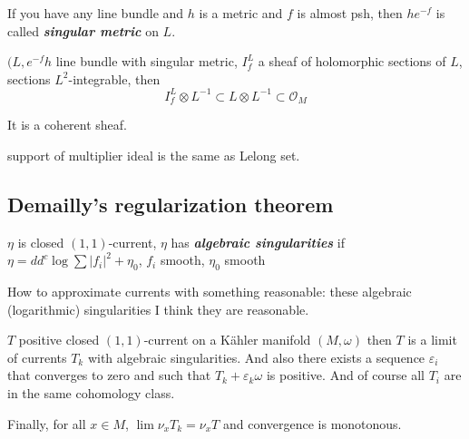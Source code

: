 \begin{defn}\leavevmode
If you have any line bundle and \(h\) is a metric and \(f\) is almost psh, then \(h e^{-f}\) is called \textit{\textbf{singular metric}} on \(L\).
\end{defn}

\begin{defn}\leavevmode
 \((L,e^{-f}h\) line bundle with singular metric, \(I^L_f\) a sheaf of holomorphic sections of \(L\), sections \(L^2\)-integrable, then
 \[I^L_f \otimes L^{-1} \subset L \otimes L^{-1} \subset \mathcal{O}_M\]
 
\end{defn}

\begin{thm}[Nadel]\leavevmode
It is a coherent sheaf.
\end{thm}

\begin{upshot}\leavevmode
support of multiplier ideal is the same as Lelong set.
\end{upshot}


\subsection{Demailly's regularization theorem}

\begin{defn}\leavevmode
\(\eta\) is closed \((1,1)\)-current, \(\eta\) has \textit{\textbf{algebraic singularities}} if \(\eta=dd^c \operatorname{log} \sum |f_i|^2+\eta_0\), \(f_i\) smooth, \(\eta_0\) smooth
\end{defn}

\begin{upshot}\leavevmode
How to approximate currents with something reasonable: these algebraic (logarithmic) singularities I think they are reasonable.
\end{upshot}

\begin{thm}\leavevmode
	\(T\) positive closed \((1,1)\)-current on a Kähler manifold \((M,\omega)\) then \(T\) is a limit of currents \(T_k\) with algebraic singularities. And also there exists a sequence \(\varepsilon_i\) that converges to zero and such that \(T_k+ \varepsilon_k \omega\) is positive. And of course  all  \(T_i\) are in the same cohomology class. 

	Finally, for all \(x \in M\), \(\lim \nu_x T_k = \nu_x T\) and convergence is monotonous.
\end{thm}

